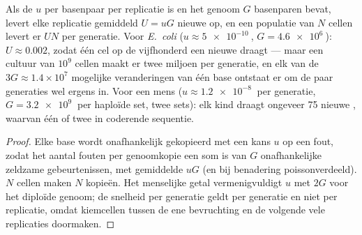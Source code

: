 \begin{theorem}\label{thm:b2:genome-diversification:rate}
Als de  $u$ per basenpaar per replicatie is en het
genoom $G$ basenparen bevat, levert elke replicatie gemiddeld
$U = uG$ nieuwe  op, en een populatie van $N$ cellen levert er
$UN$ per generatie. Voor \emph{E.~coli} ($u \approx \qty{5e-10}{}$, $G =
\qty{4.6e6}{}$): $U \approx 0.002$, zodat één cel op de vijfhonderd een
nieuwe  draagt --- maar een cultuur van $10^{9}$ cellen maakt er
twee miljoen per generatie, en elk van de $3G \approx 1.4\times
10^{7}$ mogelijke veranderingen van één base ontstaat er om de paar
generaties wel ergens in. Voor een mens ($u \approx \qty{1.2e-8}{}$ per
generatie, $G = \qty{3.2e9}{}$ per haploïde set, twee sets): elk kind
draagt ongeveer \num{75} nieuwe , waarvan één of twee in
coderende sequentie.
\end{theorem}
\begin{proof}
Elke base wordt onafhankelijk gekopieerd met een kans $u$ op een fout,
zodat het aantal fouten per genoomkopie een som is van $G$ onafhankelijke
zeldzame gebeurtenissen, met gemiddelde $uG$ (en bij benadering
poissonverdeeld). $N$ cellen maken $N$ kopieën. Het menselijke getal
vermenigvuldigt $u$ met $2G$ voor het diploïde genoom; de snelheid per
generatie geldt per generatie en niet per replicatie, omdat kiemcellen
tussen de ene bevruchting en de volgende vele replicaties doormaken.
\end{proof}

